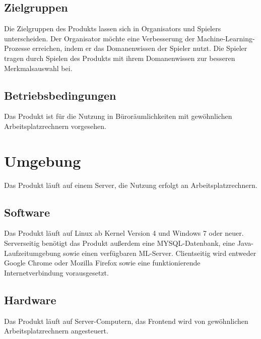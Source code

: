 \documentclass[a4paper]{scrreprt}
\begin{document}
    \section{Zielgruppen}
    Die Zielgruppen des \Gls{Produkt}s lassen sich in \Glspl{Organisator} und \Glspl{Spieler} unterscheiden.
    Der \Gls{Organisator} möchte eine Verbesserung der Machine-Learning-Prozesse erreichen, indem er das \Gls{Domanenwissen} der \Gls{Spieler} nutzt.
    Die \Gls{Spieler} tragen durch Spielen des \Gls{Produkt}s mit ihrem \Gls{Domanenwissen} zur besseren Merkmalsauswahl bei.


    \section{Betriebsbedingungen}
    Das \Gls{Produkt} ist für die Nutzung in Büroräumlichkeiten mit gewöhnlichen Arbeitsplatzrechnern vorgesehen.

    \chapter{Umgebung}
    Das \Gls{Produkt} läuft auf einem Server, die Nutzung erfolgt an Arbeitsplatzrechnern.

    \section{Software}
    Das \Gls{Produkt} läuft auf Linux ab Kernel Version 4 und Windows 7 oder neuer.
    Serverseitig benötigt das Produkt außerdem eine MYSQL-Datenbank, eine Java-Laufzeitumgebung sowie einen verfügbaren \Gls{ML-Server}.
    Clientseitig wird entweder Google Chrome oder Mozilla Firefox sowie eine funktionierende Internetverbindung vorausgesetzt.

    \section{Hardware}
    Das \Gls{Produkt} läuft auf Server-Computern, das Frontend wird von gewöhnlichen Arbeitsplatzrechnern angesteuert.
\end{document}

